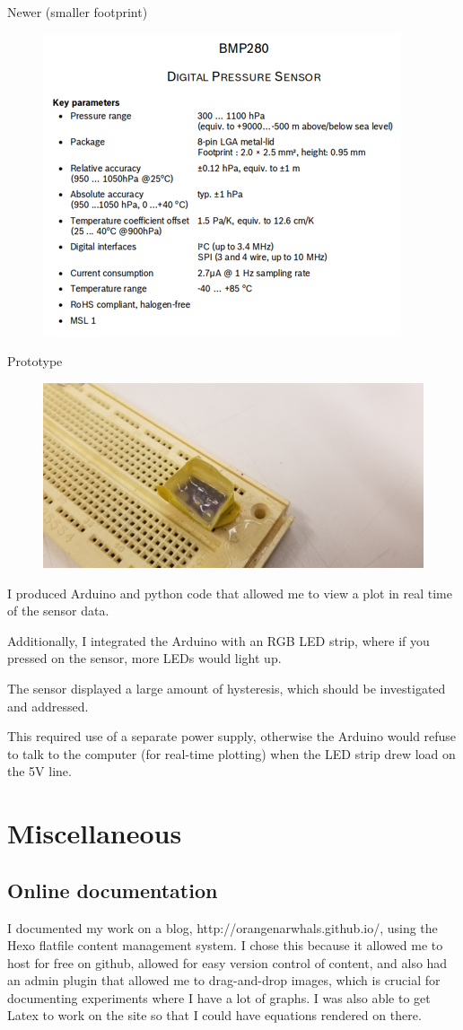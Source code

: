 \documentclass[12pt]{article}
\begin{document}
Newer (smaller footprint)
\begin{figure}[H]
\centering
\includegraphics[width=.5\textwidth]{images/sensor/new_datasheet.png}
\end{figure}

Prototype
\begin{figure}[H]
\centering
\includegraphics[width=.5\textwidth]{images/sensor/SENSOR.png}
\end{figure}

I produced Arduino and python code that allowed me to view a plot in real time of the sensor data.

Additionally, I integrated the Arduino with an RGB LED strip, where if you pressed on the sensor,
more LEDs would light up.

The sensor displayed a large amount of hysteresis, which should be investigated and addressed.

This required use of a separate power supply, otherwise the Arduino would refuse to talk to the
computer (for real-time plotting) when the LED strip drew load on the 5V line.

\section{Miscellaneous}

\subsection{Online documentation}
I documented my work on a blog, http://orangenarwhals.github.io/, using the Hexo flatfile content
management system. I chose this because it allowed me to host for free on github, allowed for easy
version control of content, and also had an admin plugin that allowed me to drag-and-drop images,
which is crucial for documenting experiments where I have a lot of graphs. I was also able to get
Latex to work on the site so that I could have equations rendered on there.
\end{document}

